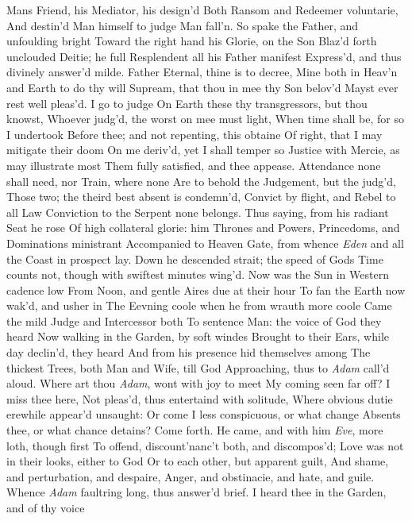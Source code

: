 \documentclass[11pt]{book}
\newcounter {first}
\begin{document}
Mans Friend, his Mediator, his design'd 
Both Ransom and Redeemer voluntarie, 
And destin'd Man himself to judge Man fall'n. 
\quad So spake the Father, and unfoulding bright 
Toward the right hand his Glorie, on the Son 
Blaz'd forth unclouded Deitie; he full 
Resplendent all his Father manifest 
Express'd, and thus divinely answer'd milde. 
\quad Father Eternal, thine is to decree, 
Mine both in Heav'n and Earth to do thy will 
Supream, that thou in mee thy Son belov'd 
Mayst ever rest well pleas'd.  I go to judge 
On Earth these thy transgressors, but thou knowst, 
Whoever judg'd, the worst on mee must light, 
When time shall be, for so I undertook 
Before thee; and not repenting, this obtaine 
Of right, that I may mitigate their doom 
On me deriv'd, yet I shall temper so 
Justice with Mercie, as may illustrate most 
Them fully satisfied, and thee appease. 
Attendance none shall need, nor Train, where none 
Are to behold the Judgement, but the judg'd, 
Those two; the theird best absent is condemn'd, 
Convict by flight, and Rebel to all Law 
Conviction to the Serpent none belongs. 
\quad Thus saying, from his radiant Seat he rose 
Of high collateral glorie: him Thrones and Powers, 
Princedoms, and Dominations ministrant 
Accompanied to Heaven Gate, from whence 
\textit{Eden} and all the Coast in prospect lay. 
Down he descended strait; the speed of Gods 
Time counts not, though with swiftest minutes wing'd. 
Now was the Sun in Western cadence low 
From Noon, and gentle Aires due at their hour 
To fan the Earth now wak'd, and usher in 
The Eevning coole when he from wrauth more coole 
Came the mild Judge and Intercessor both 
To sentence Man: the voice of God they heard 
Now walking in the Garden, by soft windes 
Brought to their Ears, while day declin'd, they heard 
And from his presence hid themselves among 
The thickest Trees, both Man and Wife, till God 
Approaching, thus to \textit{Adam} call'd aloud. 
\quad Where art thou \textit{Adam}, wont with joy to meet 
My coming seen far off?  I miss thee here, 
Not pleas'd, thus entertaind with solitude, 
Where obvious dutie erewhile appear'd unsaught: 
Or come I less conspicuous, or what change 
Absents thee, or what chance detains?  Come forth. 
He came, and with him \textit{Eve}, more loth, though first 
To offend, discount'nanc't both, and discompos'd; 
Love was not in their looks, either to God 
Or to each other, but apparent guilt, 
And shame, and perturbation, and despaire, 
Anger, and obstinacie, and hate, and guile. 
Whence \textit{Adam} faultring long, thus answer'd brief. 
\quad I heard thee in the Garden, and of thy voice 
\end{document}
